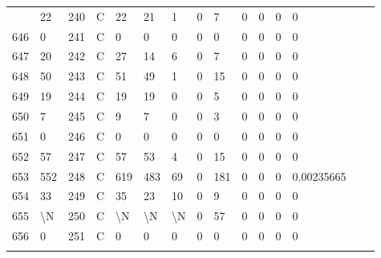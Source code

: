 \begin{longtable}{lllllllllllllll}
\begin{comment}
	645 & 22                & 240 & C   & 22                & 21                & 1                 & 0    & 7          & 0              & 0              & 0             & 0            \\
	646 & 0                 & 241 & C   & 0                 & 0                 & 0                 & 0    & 0          & 0              & 0              & 0             & 0            \\
	647 & 20                & 242 & C   & 27                & 14                & 6                 & 0    & 7          & 0              & 0              & 0             & 0            \\
	648 & 50                & 243 & C   & 51                & 49                & 1                 & 0    & 15         & 0              & 0              & 0             & 0            \\
	649 & 19                & 244 & C   & 19                & 19                & 0                 & 0    & 5          & 0              & 0              & 0             & 0            \\
	650 & 7                 & 245 & C   & 9                 & 7                 & 0                 & 0    & 3          & 0              & 0              & 0             & 0            \\
	651 & 0                 & 246 & C   & 0                 & 0                 & 0                 & 0    & 0          & 0              & 0              & 0             & 0            \\
	652 & 57                & 247 & C   & 57                & 53                & 4                 & 0    & 15         & 0              & 0              & 0             & 0            \\
	653 & 552               & 248 & C   & 619               & 483               & 69                & 0    & 181        & 0              & 0              & 0             & 0.00235665   \\
	654 & 33                & 249 & C   & 35                & 23                & 10                & 0    & 9          & 0              & 0              & 0             & 0            \\
	655 & \textbackslash{}N & 250 & C   & \textbackslash{}N & \textbackslash{}N & \textbackslash{}N & 0    & 57         & 0              & 0              & 0             & 0            \\
	656 & 0                 & 251 & C   & 0                 & 0                 & 0                 & 0    & 0          & 0              & 0              & 0             & 0            \\

\end{comment}
\end{longtable}

